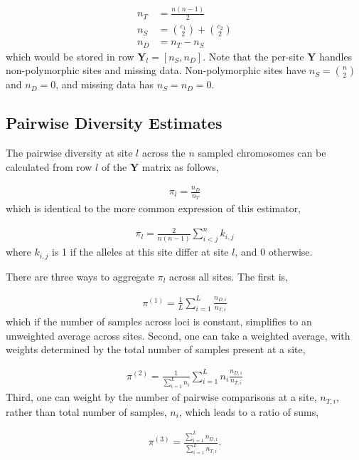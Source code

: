 \documentclass[11pt]{article}
\begin{document}
\begin{align*}
  n_T &= \frac{n(n-1)}{2} \\
  n_S &= {c_1 \choose 2} + {c_2 \choose 2} \\
  n_D &= n_T - n_S
\end{align*}
%
which would be stored in row $\mathbf{Y}_l = [n_S, n_D]$. Note that the
per-site $\mathbf{Y}$ handles non-polymorphic sites and missing data.
Non-polymorphic sites have $n_S = {n \choose 2}$ and $n_D = 0$, and missing
data has $n_S = n_D = 0$.

\subsection{Pairwise Diversity Estimates}
\label{supp:diversity}

The pairwise diversity at site $l$ across the $n$ sampled chromosomes can be
calculated from row $l$ of the $\mathbf{Y}$ matrix as follows,

\begin{align}
  \pi_l = \frac{n_D}{n_T}
\end{align}
%
which is identical to the more common expression of this estimator, 

\begin{align}
  \pi_l = \frac{2}{n(n-1)} \sum_{i < j}^n k_{i,j}
\end{align}
%
where $k_{i,j}$ is 1 if the alleles at this site differ at site $l$, and 0
otherwise.

There are three ways to aggregate $\pi_l$ across all sites. The first is,

\begin{align}
  \label{eq:}
  \pi^{(1)} = \frac{1}{L} \sum_{i=1}^L \frac{n_{D,i}}{n_{T,i}}
\end{align}
%
which if the number of samples across loci is constant, simplifies to an
unweighted average across sites. Second, one can take a weighted average, with
weights determined by the total number of samples present at a site,

\begin{align}
  \label{eq:}
  \pi^{(2)} = \frac{1}{\sum_{i=1}^L n_i} \sum_{i=1}^L n_i \frac{n_{D,i}}{n_{T,i}}
\end{align}
%
Third, one can weight by the number of pairwise comparisons at a site,
$n_{T,i}$, rather than total number of samples, $n_i$, which leads to a ratio
of sums,

\begin{align}
  \label{eq:}
  \pi^{(3)} = \frac{\sum_{i=1}^L n_{D,i}}{\sum_{i=1}^L n_{T,i}}.
\end{align}
\end{document}
